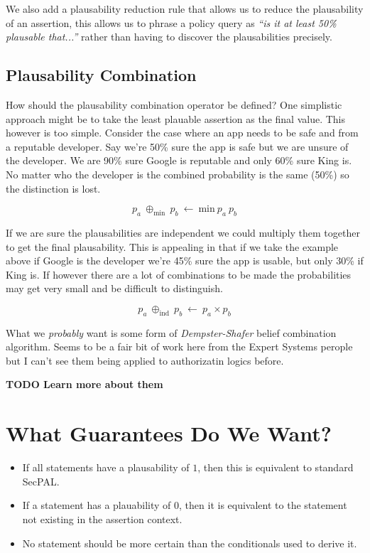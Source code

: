 \documentclass[a4paper]{article}
\begin{document}
We also add a plausability reduction rule that allows us to reduce the plausability of an assertion, this allows us to phrase a policy query as \emph{``is it at least 50\% plausable that...''} rather than having to discover the plausabilities precisely.

\subsection{Plausability Combination}

How should the plausability combination operator be defined?
One simplistic approach might be to take the least plauable assertion as the final value.
This however is too simple. Consider the case where an app needs to be safe and from a reputable developer.  Say we're 50\% sure the app is safe but we are unsure of the developer. We are 90\% sure Google is reputable and only 60\% sure King is.  No matter who the developer is the combined probability is the same (50\%) so the distinction is lost.

\begin{equation}
  p_a~\oplus_{\text{min}}~p_b~\gets~\text{min}~p_a~p_b
\end{equation}

If we are sure the plausabilities are independent we could multiply them together to get the final plausability. This is appealing in that if we take the example above if Google is the developer we're 45\% sure the app is usable, but only 30\% if King is.  If however there are a lot of combinations to be made the probabilities may get very small and be difficult to distinguish.

\begin{equation}
  p_a~\oplus_{\text{ind}}~p_b~\gets~p_a\times p_b
\end{equation}

What we \emph{probably} want is some form of \emph{Dempster-Shafer} belief combination algorithm.  Seems to be a fair bit of work here from the Expert Systems perople but I can't see them being applied to authorizatin logics before.

\textbf{TODO Learn more about them}

\section{What Guarantees Do We Want?} 

\begin{itemize}
\item If all statements have a plausability of $1$, then this is equivalent to standard SecPAL.
\item If a statement has a plauability of $0$, then it is equivalent to the statement not existing in the assertion context.
\item No statement should be more certain than the conditionals used to derive it.
\end{itemize}
\end{document}
